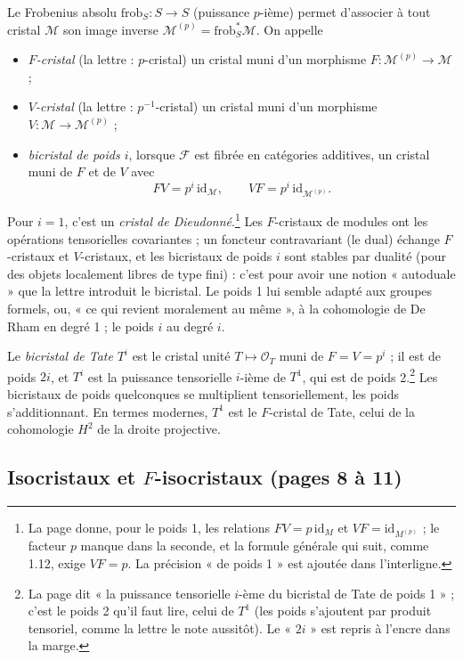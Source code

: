 \documentclass[11pt,a4paper]{article}
\begin{document}
Le Frobenius absolu $\mathrm{frob}_S : S \to S$ (puissance $p$-ième) permet
d'associer à tout cristal $\mathcal{M}$ son image inverse
$\mathcal{M}^{(p)} = \mathrm{frob}_S^*\mathcal{M}$. On appelle
\begin{itemize}
\item \emph{$F$-cristal} (la lettre : $p$-cristal) un cristal muni d'un
morphisme $F : \mathcal{M}^{(p)} \to \mathcal{M}$ ;
\item \emph{$V$-cristal} (la lettre : $p^{-1}$-cristal) un cristal muni d'un
morphisme $V : \mathcal{M} \to \mathcal{M}^{(p)}$ ;
\item \emph{bicristal de poids $i$}, lorsque $\mathcal{F}$ est fibrée en
catégories additives, un cristal muni de $F$ et de $V$ avec
\[
  FV = p^i\,\mathrm{id}_{\mathcal{M}}, \qquad VF = p^i\,\mathrm{id}_{\mathcal{M}^{(p)}} .
\]
\end{itemize}
Pour $i = 1$, c'est un \emph{cristal de Dieudonné}.\footnote{La page donne, pour
le poids 1, les relations $FV = p\,\mathrm{id}_M$ et $VF = \mathrm{id}_{M^{(p)}}$ ;
le facteur $p$ manque dans la seconde, et la formule générale qui suit, comme
1.12, exige $VF = p$. La précision « de poids 1 » est ajoutée dans
l'interligne.} Les $F$-cristaux de modules ont les opérations tensorielles
covariantes ; un foncteur contravariant (le dual) échange $F$-cristaux et
$V$-cristaux, et les bicristaux de poids $i$ sont stables par dualité (pour des
objets localement libres de type fini) : c'est pour avoir une notion
« autoduale » que la lettre introduit le bicristal. Le poids 1 lui semble
adapté aux groupes formels, ou, « ce qui revient moralement au même », à la
cohomologie de De Rham en degré 1 ; le poids $i$ au degré $i$.

Le \emph{bicristal de Tate} $T^i$ est le cristal unité $T \mapsto \mathcal{O}_T$
muni de $F = V = p^i$ ; il est de poids $2i$, et $T^i$ est la puissance
tensorielle $i$-ième de $T^1$, qui est de poids 2.\footnote{La page dit « la
puissance tensorielle $i$-ème du bicristal de Tate de poids 1 » ; c'est le
poids 2 qu'il faut lire, celui de $T^1$ (les poids s'ajoutent par produit
tensoriel, comme la lettre le note aussitôt). Le « $2i$ » est repris à l'encre
dans la marge.} Les bicristaux de poids quelconques se multiplient
tensoriellement, les poids s'additionnant. En termes modernes, $T^1$ est le
$F$-cristal de Tate, celui de la cohomologie $H^2$ de la droite projective.

\subsection*{Isocristaux et $F$-isocristaux (pages 8 à 11)}
\end{document}
